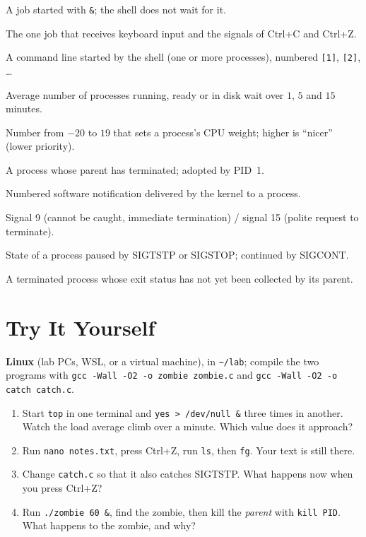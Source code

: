 \documentclass[11pt,a4paper]{article}
\newcommand{\cmd}[1]{\texttt{#1}}
\begin{document}
\begin{description}[leftmargin=0pt,itemsep=0.15em]
  \item[Background job] A job started with \texttt{\&}; the shell does not wait for it.
  \item[Foreground job] The one job that receives keyboard input and the signals of Ctrl+C and Ctrl+Z.
  \item[Job] A command line started by the shell (one or more processes), numbered \texttt{[1]}, \texttt{[2]}, \dots
  \item[Load average] Average number of processes running, ready or in disk wait over $1$, $5$ and $15$ minutes.
  \item[Nice value] Number from $-20$ to $19$ that sets a process's CPU weight; higher is ``nicer'' (lower priority).
  \item[Orphan] A process whose parent has terminated; adopted by PID~1.
  \item[Signal] Numbered software notification delivered by the kernel to a process.
  \item[SIGKILL / SIGTERM] Signal 9 (cannot be caught, immediate termination) / signal 15 (polite request to terminate).
  \item[Stopped (T)] State of a process paused by SIGTSTP or SIGSTOP; continued by SIGCONT.
  \item[Zombie (Z)] A terminated process whose exit status has not yet been collected by its parent.
\end{description}

\section{Try It Yourself}

\begin{tryit}
\textbf{Linux} (lab PCs, WSL, or a virtual machine), in \texttt{\textasciitilde/lab}; compile the two programs with \cmd{gcc -Wall -O2 -o zombie zombie.c} and \cmd{gcc -Wall -O2 -o catch catch.c}.
\begin{enumerate}[leftmargin=1.4em]
  \item Start \cmd{top} in one terminal and \cmd{yes > /dev/null \&} three times in another. Watch the load average climb over a minute. Which value does it approach?
  \item Run \cmd{nano notes.txt}, press Ctrl+Z, run \cmd{ls}, then \cmd{fg}. Your text is still there.
  \item Change \texttt{catch.c} so that it also catches SIGTSTP. What happens now when you press Ctrl+Z?
  \item Run \cmd{./zombie 60 \&}, find the zombie, then kill the \emph{parent} with \cmd{kill PID}. What happens to the zombie, and why?
\end{enumerate}
\end{tryit}
\end{document}
